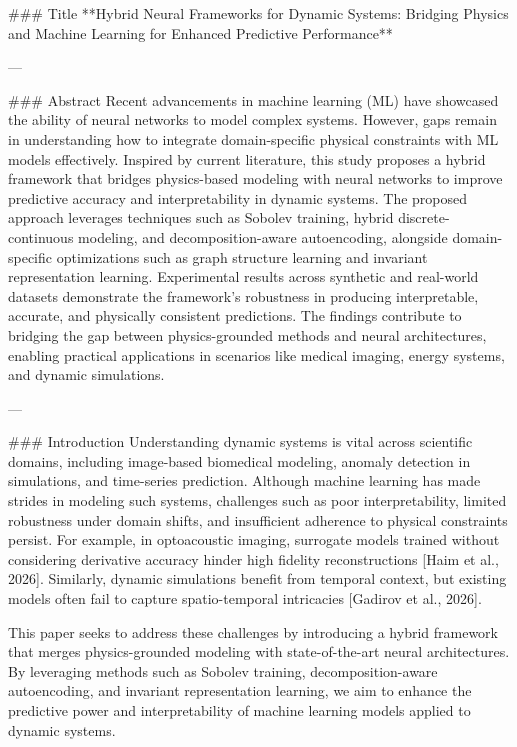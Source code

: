 ### Title  
**Hybrid Neural Frameworks for Dynamic Systems: Bridging Physics and Machine Learning for Enhanced Predictive Performance**  

---

### Abstract  
Recent advancements in machine learning (ML) have showcased the ability of neural networks to model complex systems. However, gaps remain in understanding how to integrate domain-specific physical constraints with ML models effectively. Inspired by current literature, this study proposes a hybrid framework that bridges physics-based modeling with neural networks to improve predictive accuracy and interpretability in dynamic systems. The proposed approach leverages techniques such as Sobolev training, hybrid discrete-continuous modeling, and decomposition-aware autoencoding, alongside domain-specific optimizations such as graph structure learning and invariant representation learning. Experimental results across synthetic and real-world datasets demonstrate the framework’s robustness in producing interpretable, accurate, and physically consistent predictions. The findings contribute to bridging the gap between physics-grounded methods and neural architectures, enabling practical applications in scenarios like medical imaging, energy systems, and dynamic simulations.  

---

### Introduction  
Understanding dynamic systems is vital across scientific domains, including image-based biomedical modeling, anomaly detection in simulations, and time-series prediction. Although machine learning has made strides in modeling such systems, challenges such as poor interpretability, limited robustness under domain shifts, and insufficient adherence to physical constraints persist. For example, in optoacoustic imaging, surrogate models trained without considering derivative accuracy hinder high fidelity reconstructions [Haim et al., 2026]. Similarly, dynamic simulations benefit from temporal context, but existing models often fail to capture spatio-temporal intricacies [Gadirov et al., 2026].  

This paper seeks to address these challenges by introducing a hybrid framework that merges physics-grounded modeling with state-of-the-art neural architectures. By leveraging methods such as Sobolev training, decomposition-aware autoencoding, and invariant representation learning, we aim to enhance the predictive power and interpretability of machine learning models applied to dynamic systems.  

